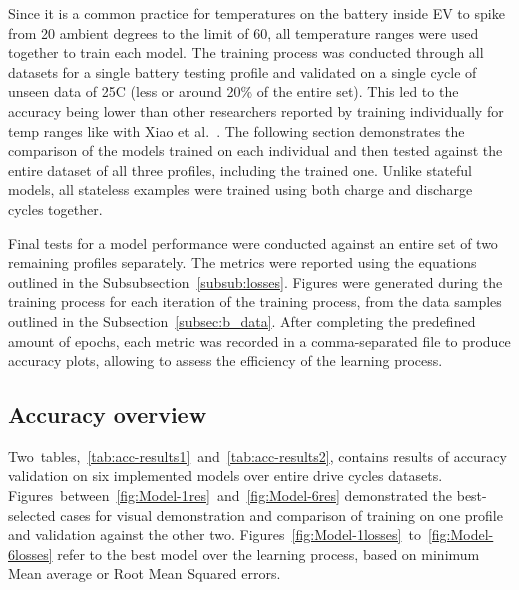 Since it is a common practice for temperatures on the battery inside EV to spike from 20 ambient degrees to the limit of 60, all temperature ranges were used together to train each model.
The training process was conducted through all datasets for a single battery testing profile and validated on a single cycle of unseen data of 25\textdegree{}C (less or around 20\% of the entire set).
This led to the accuracy being lower than other researchers reported by training individually for temp ranges like with Xiao et al.~\cite{xiao_accurate_2019}.
The following section demonstrates the comparison of the models trained on each individual and then tested against the entire dataset of all three profiles, including the trained one.
Unlike stateful models, all stateless examples were trained using both charge and discharge cycles together.

%
%
Final tests for a model performance were conducted against an entire set of two remaining profiles separately.
The metrics were reported using the equations outlined in the \mbox{Subsubsection~\ref{subsub:losses}}.
Figures were generated during the training process for each iteration of the training process, from the data samples outlined in the \mbox{Subsection~\ref{subsec:b_data}}.
After completing the predefined amount of epochs, each metric was recorded in a comma-separated file to produce accuracy plots, allowing to assess the efficiency of the learning process.

%
%
\subsection{Accuracy overview}
\mbox{Two tables, \ref{tab:acc-results1} and \ref{tab:acc-results2}}, contains results of accuracy validation on six implemented models over entire drive cycles datasets.
\mbox{Figures between \ref{fig:Model-1res} and \ref{fig:Model-6res}} demonstrated the best-selected cases for visual demonstration and comparison of training on one profile and validation against the other two.
\mbox{Figures \ref{fig:Model-1losses} to \ref{fig:Model-6losses}} refer to the best model over the learning process, based on minimum Mean average or Root Mean Squared errors.

